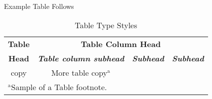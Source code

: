 \documentclass[conference]{IEEEtran}
\begin{document}
Example Table Follows

\begin{table}[htbp]
\caption{Table Type Styles}
\begin{center}
\begin{tabular}{|c|c|c|c|}
\hline
\textbf{Table}&\multicolumn{3}{|c|}{\textbf{Table Column Head}} \\
\cline{2-4} 
\textbf{Head} & \textbf{\textit{Table column subhead}}& \textbf{\textit{Subhead}}& \textbf{\textit{Subhead}} \\
\hline
copy& More table copy$^{\mathrm{a}}$& &  \\
\hline
\multicolumn{4}{l}{$^{\mathrm{a}}$Sample of a Table footnote.}
\end{tabular}
\label{tab1}
\end{center}
\end{table}



\begin{flushleft}

\end{flushleft}
\end{document}
